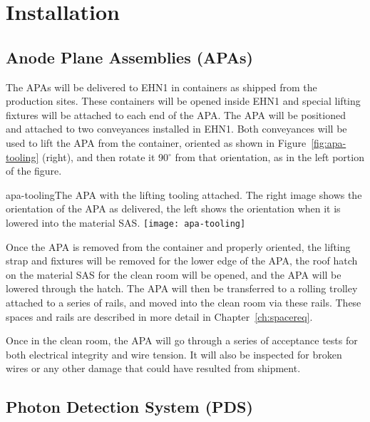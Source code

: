 
\section{Installation}


\subsection{Anode Plane Assemblies (APAs)}

The APAs will be delivered to EHN1 in containers as shipped from the production sites.  These containers will be opened inside EHN1 and special lifting fixtures will be attached to each end of the APA.  The APA will be positioned and attached to two conveyances installed in EHN1.  Both conveyances will be used to lift the APA from the container, oriented as shown in Figure~\ref{fig:apa-tooling} (right), and then rotate it 90$^\circ$ from that orientation, as in the left portion of the figure.

\begin{cdrfigure}{apa-tooling}{The APA with the lifting tooling attached.  The right image shows the orientation of the APA as delivered, the left shows the orientation when it is lowered into the material SAS. }
\texttt{[image: apa-tooling]}
\end{cdrfigure}

Once the APA is removed from the container and properly oriented, the lifting strap and fixtures will be removed for the lower edge of the APA, the roof hatch on the material SAS for 
 the clean room will be opened, and the APA will be lowered through the hatch.  The APA will then be transferred to a rolling trolley attached to a series of rails, and moved into the clean room via these rails.  These spaces and rails are described in more detail in Chapter~\ref{ch:spacereq}. 

Once in the clean room, the APA will go through a series of acceptance tests for both electrical integrity and wire tension.  It will also be inspected for broken wires or any other damage that could have resulted from shipment.  

\subsection{Photon Detection System (PDS)}


